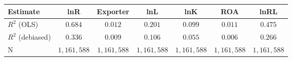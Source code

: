 \begin{tabular}{l*{6}{c}}
\hline\hline
 Estimate & lnR & Exporter & lnL & lnK & ROA & lnRL \\
\hline
\addlinespace $ R^2$ (OLS) & $0.684$ & $0.012$ & $0.201$ & $0.099$ & $0.011$ & $0.475$ \\
$ R^2$ (debiased) & $0.336$ & $0.009$ & $0.106$ & $0.055$ & $0.006$ & $0.266$ \\
N & $1,161,588$ & $1,161,588$ & $1,161,588$ & $1,161,588$ & $1,161,588$ & $1,161,588$ \\
\hline\hline
\end{tabular}
